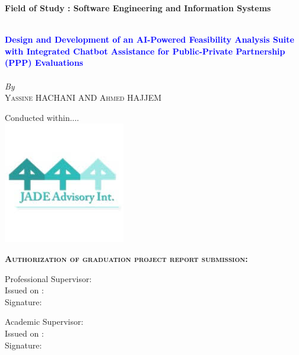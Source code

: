 \begin{titlepage}
\textbf{Field of Study : Software Engineering and Information Systems}

\vskip1cm%


\HRule \\[0.4cm]
\textcolor{blue}{ \large \bfseries Design and Development of an AI-Powered Feasibility Analysis Suite with Integrated Chatbot Assistance for Public-Private Partnership (PPP) Evaluations}\\[0.2cm] %
\HRule \\[1cm]

\vskip0.5cm%
\textit{By}\\
\textsc{\large Yassine HACHANI AND Ahmed HAJJEM}\\[0.5cm] %
\vskip0.5cm%

{Conducted within....}\\
\includegraphics[width=0.2\columnwidth]{assets/jade_advisory.jpg}\\
\vskip1cm
 


 \begin{flushleft}
\textbf{\textsc{Authorization of  graduation project report submission:}}\\[0.5cm] %
\vskip0.5cm
\begin{minipage}[c]{0.3\columnwidth}
Professional Supervisor:\\
\vskip0.5cm
Issued on :\\
\vskip0.5cm
Signature:\\

\end{minipage}
\hfill
\begin{minipage}[c]{0.4\columnwidth}
Academic Supervisor:\\
\vskip0.5cm
Issued on :\\
\vskip0.5cm
Signature:\\
\end{minipage}


\end{flushleft}
\end{titlepage}

